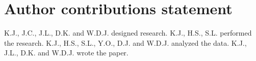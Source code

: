 \section*{Author contributions statement}

K.J., J.C., J.L., D.K. and W.D.J. designed research.
K.J., H.S., S.L. performed the research.
K.J., H.S., S.L., Y.O., D.J. and W.D.J. analyzed the data.
K.J., J.L., D.K. and W.D.J. wrote the paper.
